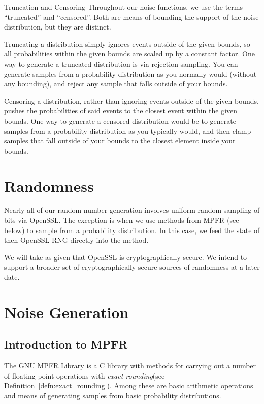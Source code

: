 \documentclass[11pt]{scrartcl} %
\begin{document}
\begin{definition}
	\label{def:truncation_censoring}
	Truncation and Censoring \newline
	Throughout our noise functions, we use the terms ``truncated'' and ``censored''.
	Both are means of bounding the support of the noise distribution, but they are distinct. \newline

	Truncating a distribution simply ignores events outside of the given bounds, so
	all probabilities within the given bounds are scaled up by a constant factor.
	One way to generate a truncated distribution is via rejection sampling.
	You can generate samples from a probability distribution as you normally would (without any bounding),
	and reject any sample that falls outside of your bounds. \newline

	Censoring a distribution, rather than ignoring events outside of the given bounds, pushes the
	probabilities of said events to the closest event within the given bounds. One way to generate
	a censored distribution would be to generate samples from a probability distribution as you
	typically would, and then clamp samples that fall outside of your bounds to the closest element
	inside your bounds.
\end{definition}

\section{Randomness}
Nearly all of our random number generation involves uniform random sampling of bits via OpenSSL. 
The exception is when we use methods from MPFR (see below) to sample from a probability distribution.
In this case, we feed the state of then OpenSSL RNG directly into the method. \newline 

We will take as given that OpenSSL is cryptographically secure. We intend to support a broader set 
of cryptographically secure sources of randomness at a later date.

\section{Noise Generation}

\subsection{Introduction to MPFR}
The \href{https://www.mpfr.org/}{GNU MPFR Library}\cite{FHL+07} is a C library with methods for carrying out a number
of floating-point operations with \emph{exact rounding}(see Definition~\ref{defn:exact_rounding}).
Among these are basic arithmetic operations and means of generating samples from basic probability distributions. \newline 
\end{document}
